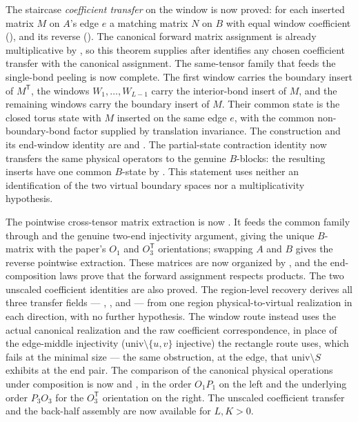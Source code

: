 \documentclass{article}
\begin{document}
The staircase \emph{coefficient transfer} on the window is now proved: for each inserted matrix $M$ on
$A$'s edge $e$ a matching matrix $N$ on $B$ with equal window coefficient
(), and its reverse ().
The canonical forward matrix assignment is already multiplicative by
, so this theorem
supplies  after
identifies any chosen coefficient transfer with the canonical assignment.  The same-tensor family that feeds the
single-bond peeling is now complete.  The first window carries the boundary insert of
$M^{\mathsf T}$, the windows $W_1,\ldots,W_{L-1}$ carry the interior-bond insert of $M$,
and the remaining windows carry the boundary insert of $M$.  Their common state is the
closed torus state with $M$ inserted on the same edge $e$, with the common
non-boundary-bond factor supplied by translation invariance.  The construction and its
end-window identity are
 and
.
The partial-state contraction identity now transfers the same physical
operators to the genuine $B$-blocks: the resulting inserts have one common
$B$-state by
.
This statement uses neither an identification of the two virtual boundary
spaces nor a multiplicativity hypothesis.

The pointwise cross-tensor matrix extraction is now
.
It feeds the common family through
 and the genuine two-end
injectivity argument, giving the unique $B$-matrix with the paper's $O_1$ and
$O_3^{\mathsf T}$ orientations; swapping $A$ and $B$ gives the reverse
pointwise extraction.  These matrices are now organized by
, and the end-composition
laws prove that the forward assignment respects products. The two unscaled
coefficient identities are also proved. The region-level recovery
 derives all three transfer fields ---
, , and  --- from one region
physical-to-virtual realization  in each direction, with
no further hypothesis. The window route instead uses the actual canonical
realization and the raw coefficient correspondence, in place of
the edge-middle injectivity
($\mathrm{univ}\setminus\{u,v\}$ injective) the rectangle route uses, which fails at the
minimal size --- the same obstruction, at the edge, that $\mathrm{univ}\setminus S$
exhibits at the end pair.  The comparison of the canonical physical operations
under composition is now
 and
, in the order $O_1P_1$ on the left
and the underlying order $P_3O_3$ for the $O_3^{\mathsf T}$ orientation on the
right. The unscaled coefficient transfer and the back-half assembly are
now available for $L,K>0$.
\end{document}
